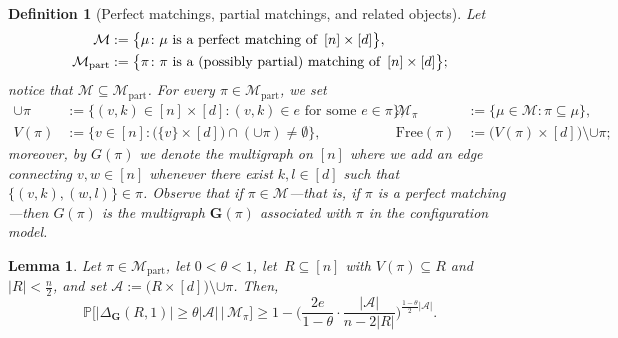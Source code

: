 \documentclass[11pt,leqno]{amsart}
\newtheorem{lemma}[theorem]{Lemma}
\newtheorem{definition}[theorem]{Definition}
\theoremstyle{remark}
\theoremstyle{plain}
\begin{document}
\begin{definition}[Perfect matchings, partial matchings, and related objects]
Let
\begin{align}
\mathcal{M} & := \big\{\mu\colon \text{$\mu$ is a perfect matching of\, } [n]\times[d]\big\}, \nonumber \\
\mathcal{M}_\mathrm{part} & := \big\{ \pi\colon \text{$\pi$ is a (possibly partial) matching of\, }[n]\times[d]\big\}; \nonumber
\end{align}
notice that $\mathcal{M}\subseteq \mathcal{M}_\mathrm{part}$. For every $\pi\in\mathcal{M}_\mathrm{part}$, we set
\begin{align*}
\cup\pi &:= \big\{(v,k)\in [n]\times [d]\colon (v,k)\in e \text{ for some } e\in\pi\big\}, &
\mathcal{M}_{\pi} & := \big\{ \mu\in\mathcal{M}\colon \pi \subseteq \mu\big\}, \\
V(\pi) & := \big \{v\in [n]\colon \big(\{v\}\times [d]\big) \cap (\cup\pi)\neq\emptyset\big\}, &
\mathrm{Free}(\pi) & := \big(V(\pi) \times [d]\big) \setminus \cup\pi;
\end{align*}
moreover, by $G(\pi)$ we denote the multigraph on $[n]$ where we add an edge connecting $v,w\in [n]$
whenever there exist $k,l\in [d]$ such that $\big\{(v,k),(w,l)\big\} \in \pi$.
Observe that if $\pi\in\mathcal{M}$---that is, if $\pi$ is a perfect matching---then $G(\pi)$ is the multigraph
$\mathbf{G}(\pi)$ associated with $\pi$ in the configuration model.
\end{definition}
\begin{lemma} \label{l1-pap}
Let $\pi\in\mathcal{M}_\mathrm{part}$, let $0<\theta<1$, let\, $R\subseteq [n]$ with $V(\pi)\subseteq R$
and $|R|<\frac{n}{2}$, and set $\mathcal{A} := \big(R\times [d]\big)\setminus \cup\pi$. Then,
\begin{equation} \label{e-pap-1}
\mathbb{P}\Big[ \big|\Delta_{\mathbf{G}}(R,1)\big|\geqslant
\theta|\mathcal{A}| \, \Big| \, \mathcal{M}_{\pi} \Big]
\geqslant 1- \Big(\frac{2 e}{1-\theta} \cdot \frac{|\mathcal{A}|}{n-2|R|}
\Big)^{\frac{1-\theta}{2}|\mathcal{A}|}.
\end{equation}
\end{lemma}
\end{document}
